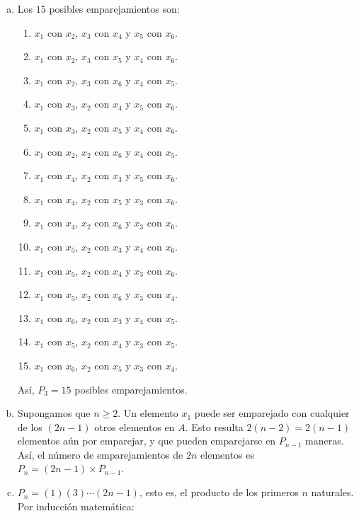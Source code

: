 \begin{solution}\leavevmode
	\begin{enumerate}[(a)]
		\item Los $15$ posibles emparejamientos son:
		\begin{enumerate}[1.]
			\item $x_{1}$ con $x_{2}$, $x_{3}$ con $x_{4}$ y $x_{5}$ con $x_{6}$.
			\item $x_{1}$ con $x_{2}$, $x_{3}$ con $x_{5}$ y $x_{4}$ con $x_{6}$.
			\item $x_{1}$ con $x_{2}$, $x_{3}$ con $x_{6}$ y $x_{4}$ con $x_{5}$.
			\item $x_{1}$ con $x_{3}$, $x_{2}$ con $x_{4}$ y $x_{5}$ con $x_{6}$.
			\item $x_{1}$ con $x_{3}$, $x_{2}$ con $x_{5}$ y $x_{4}$ con $x_{6}$.
			\item $x_{1}$ con $x_{2}$, $x_{2}$ con $x_{6}$ y $x_{4}$ con $x_{5}$.
			\item $x_{1}$ con $x_{4}$, $x_{2}$ con $x_{3}$ y $x_{5}$ con $x_{6}$.
			\item $x_{1}$ con $x_{4}$, $x_{2}$ con $x_{5}$ y $x_{3}$ con $x_{6}$.
			\item $x_{1}$ con $x_{4}$, $x_{2}$ con $x_{6}$ y $x_{3}$ con $x_{6}$.
			\item $x_{1}$ con $x_{5}$, $x_{2}$ con $x_{3}$ y $x_{4}$ con $x_{6}$.
			\item $x_{1}$ con $x_{5}$, $x_{2}$ con $x_{4}$ y $x_{3}$ con $x_{6}$.
			\item $x_{1}$ con $x_{5}$, $x_{2}$ con $x_{6}$ y $x_{3}$ con $x_{4}$.
			\item $x_{1}$ con $x_{6}$, $x_{2}$ con $x_{3}$ y $x_{4}$ con $x_{5}$.
			\item $x_{1}$ con $x_{5}$, $x_{2}$ con $x_{4}$ y $x_{3}$ con $x_{5}$.
			\item $x_{1}$ con $x_{6}$, $x_{2}$ con $x_{5}$ y $x_{3}$ con $x_{4}$.
		\end{enumerate}
		Así, $P_{3}=15$ posibles emparejamientos.
		\item Supongamos que $n\geq2$. Un elemento $x_{1}$ puede ser emparejado con cualquier de los $\left(2n-1\right)$ otros elementos en $A$. Esto resulta $2\left(n-2\right)=2\left(n-1\right)$ elementos aún por emparejar, y que pueden emparejarse en $P_{n-1}$ maneras. Así, el número de emparejamientos de $2n$ elementos es $P_{n}=\left(2n-1\right)\times P_{n-1}$.
		\item $P_{n}=(1)(3)\cdots\left(2n-1\right)$, esto es, el producto de los primeros $n$ naturales. Por inducción matemática:

\end{enumerate}
\end{solution}
